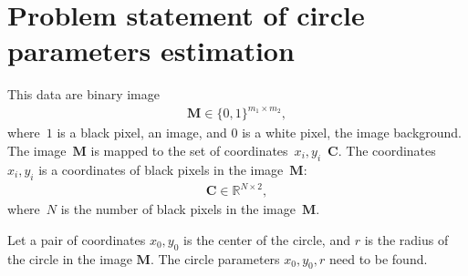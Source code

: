 \documentclass[12pt, twoside]{article}
\begin{document}
\section{Problem statement of circle parameters estimation}
This data are binary image
\[
\label{eq:st:cr:1}
\begin{aligned}
\textbf{M} \in \{0,1\}^{m_1 \times m_2},
\end{aligned}
\]
where~$1$ is a black pixel, an image, and $0$ is a white pixel, the image background.
The image~$\textbf{M}$ is mapped to the set of coordinates~$x_i, y_i$~$\textbf{C}$. The coordinates~$x_i, y_i$ is a coordinates of black pixels in the image~$\textbf{M}$:
\[
\label{eq:st:cr:2}
\begin{aligned}
\textbf{C} \in  \mathbb{R}^{N \times 2},
\end{aligned}
\]
where~$N$ is the number of black pixels in the image~$\textbf{M}$.

Let a pair of coordinates $x_0, y_0$ is the center of the circle, and $r$ is the radius of the circle in the image $\textbf{M}$.
The circle parameters $x_0, y_0, r$ need to be found.
 
\end{document}
